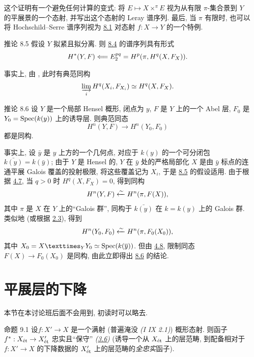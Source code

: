 这个证明有一个避免任何计算的变式:
将 $E\mapsto X\mathop{\times}^{\pi}E$
视为从有限 $\pi$-集合景到 $Y$ 的平展景的一个态射,
并写出这个态射的 Leray 谱序列.
最后, 当 $\pi$ 有限时,
也可以将 Hochschild--Serre 谱序列视为
\hyperref[VIII.prop8.1]{8.1} 对态射 $f:X\rightarrow Y$ 的一个特例.

\begin{enonce*}{推论 8.5}
假设 $Y$ 拟紧且拟分离.
则 \hyperref[VIII.prop8.4]{8.4} 的谱序列具有形式
$$
H^{\ast}(Y,F)\Longleftarrow E^{pq}_{2}=H^{p}(\pi,
H^{q}(X,F_{X})){}.
$$
\end{enonce*}

事实上, 由 , 此时有典范同构
$$
\varinjlim_{i} H^{q}(X_{i},F_{X_{i}})\simeq H^{q}(X,F_{X}){}.
$$

\begin{enonce*}{推论 8.6}
设 $Y$ 是一个局部 Hensel 概形, 闭点为 $y$,
$F$ 是 $Y$ 上的一个 Abel 层,
$F_{0}$ 是 $Y_{0}=\operatorname{Spec} (k(y))$ 上的诱导层.
则典范同态
$$
H^{n}(Y,F)\longrightarrow H^{n}(Y_{0},F_{0})
$$
都是\pageoriginale 同构.
\end{enonce*}

事实上, 设 $\bar y$ 是 $y$ 上方的一个几何点,
对应于 $k(y)$ 的一个可分闭包 $\bar{k(y)}=k(\bar{y})$;
由于 $Y$ 是 Hensel 的,
$Y$ 在 $\bar y$ 处的严格局部化 $X$
是由 $\bar y$ 标点的连通平展 Galois 覆盖的投射极限,
将这些覆盖记为 $X_i$,
于是 \hyperref[VIII.cor8.5]{8.5} 的假设适用.
由于根据 \hyperref[VIII.cor4.7]{4.7},
当 $q>0$ 时 $H^{q}(X,F_{X})=0$, 得到同构
$$
H^{n}(Y,F)\xleftarrow{\sim} H^{n}(\pi, F(X)){},
$$
其中 $\pi$ 是 $X$ 在 $Y$ 上的“Galois 群”,
同构于 $\bar{k(y)}$ 在 $k=k(y)$ 上的 Galois 群.
类似地 (或根据 \hyperref[VIII.cor2.3]{2.3}), 得到
$$
H^{n}(Y_{0},F_{0})\xleftarrow{\sim} H^{n}(\pi,F_{0}(X_{0})){},
$$
其中 $X_{0}=\fprod{X}{Y_{0}}{Y}\simeq \Spec (k(\bar{y}))$.
但由 \hyperref[VIII.cor4.8]{4.8},
限制同态 $F(X)\rightarrow F_{0}(X_{0})$ 是同构,
由此立即得出 \hyperref[VIII.cor8.6]{8.6} 的结论.

\section{平展层的下降}

本节在本讨论班后面不会用到, 初读时可以略去.

\begin{enonce*}{命题 9.1}
设\pageoriginale $f:X'\rightarrow X$ 是一个满射
(\resp 普遍淹没 \emph{(\SGA I IX 2.1)}) 概形态射.
则函子 $f^{\ast}:X_{\text{\rm ét}}\rightarrow X'_{\text{\rm ét}}$
忠实且“保守” \emph{(\cf \hyperref[VIII.cor3.6]{3.6})}
(\resp 诱导一个从 $X_{\text{\rm ét}}$ 上的层范畴,
到配备相对于 $f:X'\rightarrow X$ 的下降数据的
$X'_{\text{\rm ét}}$ 上的层范畴的\emph{全忠实}函子).
\end{enonce*}

